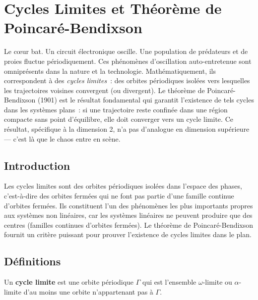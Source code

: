 \chapter{Cycles Limites et Th\'eor\`eme de Poincar\'e-Bendixson}
\label{ch:cycles_limites}

Le c\oe ur bat. Un circuit \'electronique oscille. Une population de pr\'edateurs et de proies fluctue p\'eriodiquement. Ces ph\'enom\`enes d'oscillation auto-entretenue sont omnipr\'esents dans la nature et la technologie. Math\'ematiquement, ils correspondent \`a des \emph{cycles limites}~: des orbites p\'eriodiques isol\'ees vers lesquelles les trajectoires voisines convergent (ou divergent). Le th\'eor\`eme de Poincar\'e-Bendixson (1901) est le r\'esultat fondamental qui garantit l'existence de tels cycles dans les syst\`emes plans~: si une trajectoire reste confin\'ee dans une r\'egion compacte sans point d'\'equilibre, elle doit converger vers un cycle limite. Ce r\'esultat, sp\'ecifique \`a la dimension 2, n'a pas d'analogue en dimension sup\'erieure --- c'est l\`a que le chaos entre en sc\`ene.

\section{Introduction}

Les cycles limites sont des orbites p\'eriodiques isol\'ees dans l'espace des
phases, c'est-\`a-dire des orbites ferm\'ees qui ne font pas partie d'une
famille continue d'orbites ferm\'ees. Ils constituent l'un des ph\'enom\`enes
les plus importants propres aux syst\`emes non lin\'eaires, car les syst\`emes
lin\'eaires ne peuvent produire que des centres (familles continues d'orbites
ferm\'ees). Le th\'eor\`eme de Poincar\'e-Bendixson fournit un crit\`ere
puissant pour prouver l'existence de cycles limites dans le plan.

\section{D\'efinitions}

\begin{definition}
Un \textbf{cycle limite} est une orbite p\'eriodique $\Gamma$ qui est
l'ensemble $\omega$-limite ou $\alpha$-limite d'au moins une orbite
n'appartenant pas \`a $\Gamma$.
\end{definition}

